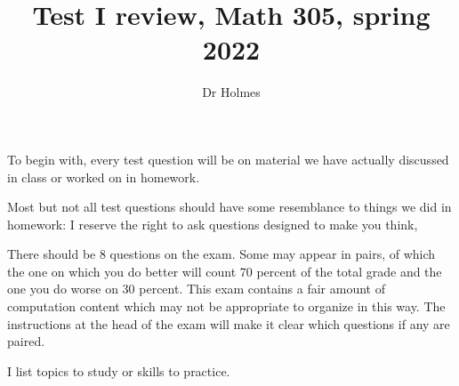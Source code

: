 \documentclass[12pt]{article}
\title{Test I review, Math 305, spring 2022}
\author{Dr Holmes}
\begin{document}
\maketitle
To begin with, every test question will be on material we have actually discussed in class or worked on in homework.

Most but not all test questions should have some resemblance to things we did in homework:  I reserve the right to ask questions designed to make you think,



There should be 8 questions on the exam.  Some may appear in pairs, of which the one on which you do better will count 70 percent of the total grade and the one you do worse on 30 percent.  This exam contains a fair amount of computation content which may not be appropriate to organize in this way.  The instructions at the head of the exam will make it clear which questions if any are paired.

I list topics to study or skills to practice.
\end{document}
